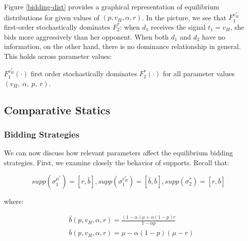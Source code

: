 \noindent Figure \ref{bidding-dist} provides a graphical representation of equilibrium distributions for given values of $ (p, v_H, \alpha, r) $. In the picture, we see that $ F_1^{v_H^*} $ first-order stochastically dominates $ F_2^* $: when $ d_1 $ receives the signal $ t_1 = v_H $, she bids more aggressively than her opponent. When both $ d_1 $ and $ d_2 $ have no information, on the other hand, there is no dominance relationship in general. This holds across parameter values:

\begin{lem}\label{lem:stoch}
$ F_1^{v_H^*}(\cdot) $ first order stochastically dominates $ F_2^*(\cdot) $ for all parameter values $(v_H,\ \alpha,\ p, \ r)$.
\end{lem}

\subsection{Comparative Statics}
\subsubsection{Bidding Strategies}
\noindent We can now discuss how relevant parameters affect the equilibrium bidding strategies. First, we examine closely the behavior of supports. Recall that:

\begin{equation*}
 supp\left( \sigma_1^{\mu^*} \right) = [r, \hat{b}],  supp\left( \sigma_1^{v_H^*} \right) = [\hat{b}, \overline{b}],  supp\left( \sigma_2^* \right) = [r, \overline{b}]
\end{equation*}

\noindent where:

\begin{align*}
 &\hat{b}(p, v_H, \alpha, r) = \frac{(1 - \alpha) \mu + \alpha (1 - p) r}{1 - \alpha p} \\[10pt]
 &\overline{b}(p, v_H, \alpha, r) = \mu - \alpha(1 - p)(\mu - r)
\end{align*}

